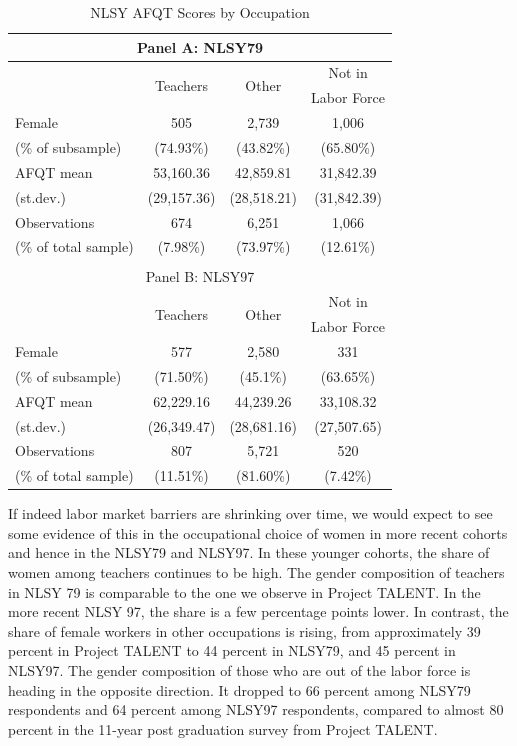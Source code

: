 \documentclass[onehalfspacing,11pt]{article}
\begin{document}
	\begin{table}[h!]
		\centering
		\begin{tabular}{lccc}
			\toprule
			\multicolumn{4}{c}{Panel A: NLSY79}\\
			\midrule
			& \multirow{2}{*}{Teachers} & \multirow{2}{*}{Other} & Not in\\
			&  &  & Labor Force\\
			\midrule
			Female & 505 & 2,739 & 1,006 \\
			\quad (\% of subsample) & (74.93\%) & (43.82\%) & (65.80\%)\\
			\midrule
			AFQT mean & 53,160.36 & 42,859.81 & 31,842.39 \\
			\quad (st.dev.) & (29,157.36) & (28,518.21) & (31,842.39) \\
			\midrule
			Observations & 674 & 6,251 & 1,066 \\
			\quad (\% of total sample) & (7.98\%) & (73.97\%) & (12.61\%) \\
			\bottomrule
			\\
			\toprule
			\multicolumn{4}{c}{Panel B: NLSY97}\\
			\midrule
			& \multirow{2}{*}{Teachers} & \multirow{2}{*}{Other} & Not in\\
			&  &  & Labor Force\\
			\midrule
			Female & 577 & 2,580 & 331\\
			\quad (\% of subsample) & (71.50\%) & (45.1\%) & (63.65\%)\\
			\midrule
			AFQT mean & 62,229.16 & 44,239.26 & 33,108.32 \\
			\quad (st.dev.) & (26,349.47) & (28,681.16) & (27,507.65) \\
			\midrule
			Observations & 807 & 5,721 & 520 \\
			\quad (\% of total sample) & (11.51\%) & (81.60\%) & (7.42\%) \\
			\bottomrule
		\end{tabular}
		\caption{NLSY AFQT Scores by Occupation}
		\label{tab:NLSYscores}
	\end{table}
	
If indeed labor market barriers are shrinking over time, we would expect to see some evidence of this in the occupational choice of women in more recent cohorts and hence in the NLSY79 and NLSY97. In these younger cohorts, the share of women among teachers continues to be high. The gender composition of teachers in NLSY 79 is comparable to the one we observe in Project TALENT. In the more recent NLSY 97, the share is a few percentage points lower. In contrast, the share of female workers in other occupations is rising, from approximately 39 percent in Project TALENT to 44 percent in NLSY79, and 45 percent in NLSY97. The gender composition of those who are out of the labor force is heading in the opposite direction. It dropped to 66 percent among NLSY79 respondents and 64 percent among NLSY97 respondents, compared to almost 80 percent in the 11-year post graduation survey from Project TALENT.
\end{document}
